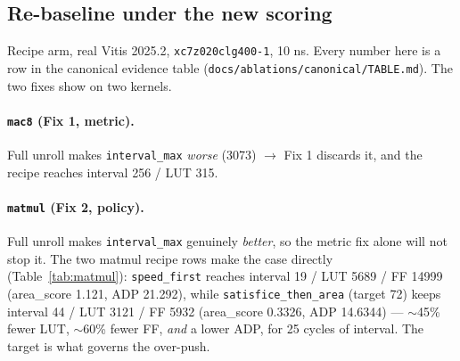 \subsection{Re-baseline under the new scoring}\label{app:scoring:rebaseline}

Recipe arm, real Vitis 2025.2, \texttt{xc7z020clg400-1}, 10 ns. Every number here is a
row in the canonical evidence table (\texttt{docs/ablations/canonical/TABLE.md}). The
two fixes show on two kernels.

\paragraph{\texttt{mac8} (Fix 1, metric).} Full unroll makes \texttt{interval\_max}
\emph{worse} (3073) $\rightarrow$ Fix 1 discards it, and the recipe reaches interval
256 / LUT 315.

\paragraph{\texttt{matmul} (Fix 2, policy).} Full unroll makes \texttt{interval\_max}
genuinely \emph{better}, so the metric fix alone will not stop it. The two matmul
recipe rows make the case directly (Table~\ref{tab:matmul}):
\texttt{speed\_first} reaches interval 19 / LUT 5689 / FF 14999 (area\_score 1.121,
ADP 21.292), while \texttt{satisfice\_then\_area} (target 72) keeps interval 44 /
LUT 3121 / FF 5932 (area\_score 0.3326, ADP 14.6344) --- $\sim$45\% fewer LUT,
$\sim$60\% fewer FF, \emph{and} a lower ADP, for 25 cycles of interval. The target is
what governs the over-push.

\begin{table}[h]
\centering\small
\caption{\texttt{matmul\_001} recipe arm: \texttt{satisfice\_then\_area} (target 72) vs.\ \texttt{speed\_first}.}
\label{tab:matmul}
\end{table}

